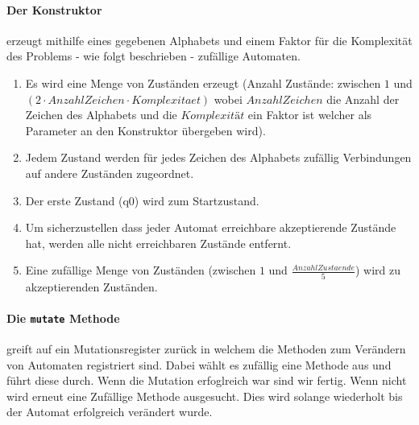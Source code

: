 \paragraph{Der Konstruktor} erzeugt mithilfe eines gegebenen Alphabets und einem Faktor für die Komplexität des Problems - wie folgt beschrieben - zufällige Automaten.
\begin{enumerate}
  \item Es wird eine Menge von Zuständen erzeugt (Anzahl Zustände: zwischen $1$ und $(2 \cdot AnzahlZeichen \cdot Komplexitaet)$ wobei $AnzahlZeichen$ die Anzahl der Zeichen des Alphabets und die $Komplexität$ ein Faktor ist welcher als Parameter an den Konstruktor übergeben wird).
  \item Jedem Zustand werden für jedes Zeichen des Alphabets zufällig Verbindungen auf andere Zuständen zugeordnet.
  \item Der erste Zustand (q0) wird zum Startzustand.
  \item Um sicherzustellen dass jeder Automat erreichbare akzeptierende Zustände hat, werden alle nicht erreichbaren Zustände entfernt.
  \item Eine zufällige Menge von Zuständen (zwischen $1$ und $\frac{AnzahlZustaende}{5}$) wird zu akzeptierenden Zuständen.
\end{enumerate}


\paragraph{Die \lstinline$mutate$ Methode} greift auf ein Mutationsregister zurück in welchem die Methoden zum Verändern von Automaten registriert sind. Dabei wählt es zufällig eine Methode aus und führt diese durch. Wenn die Mutation erfoglreich war sind wir fertig. Wenn nicht wird erneut eine Zufällige Methode ausgesucht. Dies wird solange wiederholt bis der Automat erfolgreich verändert wurde.

